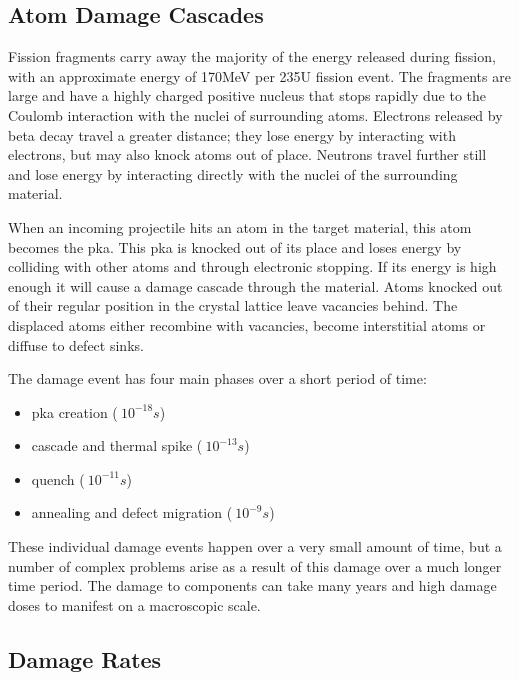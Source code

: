 \subsection{Atom Damage Cascades}

Fission fragments carry away the majority of the energy released during fission, with an approximate energy of 170MeV per 235U fission event.  The fragments are large and have a highly charged positive nucleus that stops rapidly due to the Coulomb interaction with the nuclei of surrounding atoms.  Electrons released by beta decay travel a greater distance; they lose energy by interacting with electrons, but may also knock atoms out of place.  Neutrons travel further still and lose energy by interacting directly with the nuclei of the surrounding material.

When an incoming projectile hits an atom in the target material, this atom becomes the \acrfull{pka}.  This \acrshort{pka} is knocked out of its place and loses energy by colliding with other atoms and through electronic stopping.  If its energy is high enough it will cause a damage cascade through the material.  Atoms knocked out of their regular position in the crystal lattice leave vacancies behind.  The displaced atoms either recombine with vacancies, become interstitial atoms or diffuse to defect sinks.  

The damage event has four main phases over a short period of time\cite{gswasdamage}:

\begin{itemize}
\item \acrshort{pka} creation ($~ 10^{-18}s$)
\item cascade and thermal spike ($~ 10^{-13}s$)
\item quench ($~ 10^{-11}s$)
\item annealing and defect migration ($~ 10^{-9}s$)
\end{itemize}

These individual damage events happen over a very small amount of time, but a number of complex problems arise as a result of this damage over a much longer time period.  The damage to components can take many years and high damage doses to manifest on a macroscopic scale.


\subsection{Damage Rates}
\FloatBarrier

